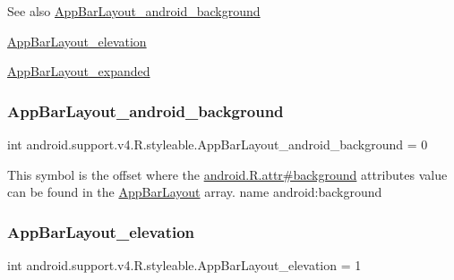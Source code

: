 \begin{DoxySeeAlso}{See also}
\hyperlink{classandroid_1_1support_1_1v4_1_1R_1_1styleable_a466e2c25659363526699f5b8c84819f2}{App\+Bar\+Layout\+\_\+android\+\_\+background} 

\hyperlink{classandroid_1_1support_1_1v4_1_1R_1_1styleable_a40cbdffd2cc9c9fdad7adeb8bc114b8d}{App\+Bar\+Layout\+\_\+elevation} 

\hyperlink{classandroid_1_1support_1_1v4_1_1R_1_1styleable_a2cbf1a78895b2153260cecf4522cd109}{App\+Bar\+Layout\+\_\+expanded} 
\end{DoxySeeAlso}
\mbox{\label{classandroid_1_1support_1_1v4_1_1R_1_1styleable_a466e2c25659363526699f5b8c84819f2}} 
\subsubsection{\texorpdfstring{App\+Bar\+Layout\+\_\+android\+\_\+background}{AppBarLayout\_android\_background}}
{\footnotesize\ttfamily int android.\+support.\+v4.\+R.\+styleable.\+App\+Bar\+Layout\+\_\+android\+\_\+background = 0\hspace{0.3cm}{\ttfamily [static]}}

This symbol is the offset where the \hyperlink{}{android.\+R.\+attr\#background} attribute\textquotesingle{}s value can be found in the \hyperlink{classandroid_1_1support_1_1v4_1_1R_1_1styleable_aa7c4e9c9d1655572bf8e4bfd804025c2}{App\+Bar\+Layout} array.  name android\+:background \mbox{\label{classandroid_1_1support_1_1v4_1_1R_1_1styleable_a40cbdffd2cc9c9fdad7adeb8bc114b8d}} 
\subsubsection{\texorpdfstring{App\+Bar\+Layout\+\_\+elevation}{AppBarLayout\_elevation}}
{\footnotesize\ttfamily int android.\+support.\+v4.\+R.\+styleable.\+App\+Bar\+Layout\+\_\+elevation = 1\hspace{0.3cm}{\ttfamily [static]}}

